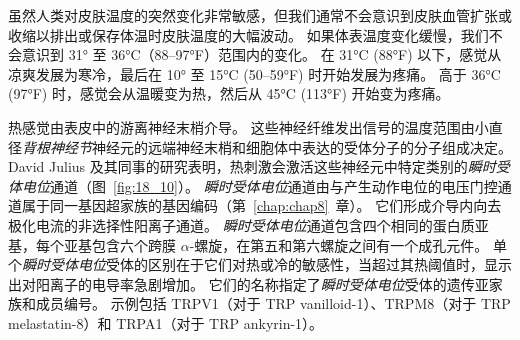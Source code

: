 虽然人类对皮肤温度的突然变化非常敏感，但我们通常不会意识到皮肤血管扩张或收缩以排出或保存体温时皮肤温度的大幅波动。
如果体表温度变化缓慢，我们不会意识到 31° 至 36°C（88–97°F）范围内的变化。
在 31°C (88°F) 以下，感觉从凉爽发展为寒冷，最后在 10° 至 15°C (50–59°F) 时开始发展为疼痛。
高于 36°C (97°F) 时，感觉会从温暖变为热，然后从 45°C (113°F) 开始变为疼痛。


热感觉由表皮中的游离神经末梢介导。
这些神经纤维发出信号的温度范围由小直径\textit{背根神经节}神经元的远端神经末梢和细胞体中表达的受体分子的分子组成决定。
David Julius 及其同事的研究表明，热刺激会激活这些神经元中特定类别的\textit{瞬时受体电位}通道（图~\ref{fig:18_10}）。
\textit{瞬时受体电位}通道由与产生动作电位的电压门控通道属于同一基因超家族的基因编码（第~\ref{chap:chap8}~章）。 
它们形成介导内向去极化电流的非选择性阳离子通道。
\textit{瞬时受体电位}通道包含四个相同的蛋白质亚基，每个亚基包含六个跨膜 $\alpha$-螺旋，在第五和第六螺旋之间有一个成孔元件。
单个\textit{瞬时受体电位}受体的区别在于它们对热或冷的敏感性，当超过其热阈值时，显示出对阳离子的电导率急剧增加。
它们的名称指定了\textit{瞬时受体电位}受体的遗传亚家族和成员编号。 
示例包括 TRPV1（对于 TRP vanilloid-1）、TRPM8（对于 TRP melastatin-8）和 TRPA1（对于 TRP ankyrin-1）。


